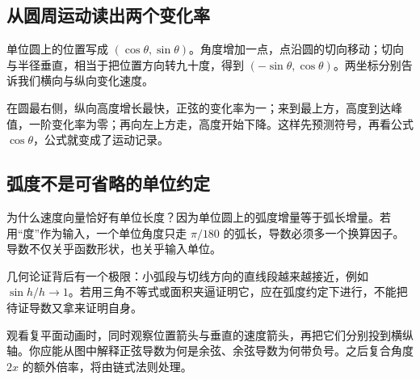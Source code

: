 \subsection*{从圆周运动读出两个变化率}
单位圆上的位置写成 $(\cos\theta,\sin\theta)$。角度增加一点，点沿圆的切向移动；切向与半径垂直，相当于把位置方向转九十度，得到 $(-\sin\theta,\cos\theta)$。两坐标分别告诉我们横向与纵向变化速度。

在圆最右侧，纵向高度增长最快，正弦的变化率为一；来到最上方，高度到达峰值，一阶变化率为零；再向左上方走，高度开始下降。这样先预测符号，再看公式 $\cos\theta$，公式就变成了运动记录。

\subsection*{弧度不是可省略的单位约定}
为什么速度向量恰好有单位长度？因为单位圆上的弧度增量等于弧长增量。若用“度”作为输入，一个单位角度只走 $\pi/180$ 的弧长，导数必须多一个换算因子。导数不仅关乎函数形状，也关乎输入单位。

几何论证背后有一个极限：小弧段与切线方向的直线段越来越接近，例如 $\sin h/h\to1$。若用三角不等式或面积夹逼证明它，应在弧度约定下进行，不能把待证导数又拿来证明自身。

观看复平面动画时，同时观察位置箭头与垂直的速度箭头，再把它们分别投到横纵轴。你应能从图中解释正弦导数为何是余弦、余弦导数为何带负号。之后复合角度 $2x$ 的额外倍率，将由链式法则处理。
